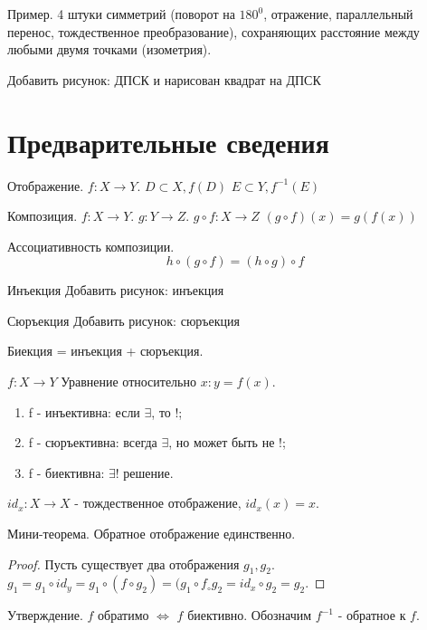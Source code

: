 \documentclass[12pt,a4paper]{report}
\begin{document}
Пример. 4 штуки симметрий (поворот на $180^0$, отражение, параллельный перенос, тождественное преобразование), сохраняющих расстояние между любыми двумя точками (изометрия).

Добавить рисунок: ДПСК и нарисован квадрат на ДПСК

\section{Предварительные сведения}

Отображение. $f\colon X\to Y$.
$D\subset X, f(D)$
$E\subset Y, f^{-1}(E)$

Композиция. $f\colon X\to Y$.
$g\colon Y\to Z$.
$g \circ f\colon X\to Z$
$(g\circ f)(x)=g(f(x))$

Ассоциативность композиции.
\[h\circ(g\circ f)=(h\circ g)\circ f\]

Инъекция
Добавить рисунок: инъекция

Сюръекция
Добавить рисунок: сюръекция

Биекция = инъекция + сюръекция.

$f\colon X\to Y$
Уравнение относительно $x\colon y = f(x)$.
\begin{enumerate}
    \item f - инъективна: если $\exists$, то !;
    \item f - сюръективна: всегда $\exists$, но может быть не !;
    \item f - биективна: $\exists!$ решение.
\end{enumerate}

$id_x\colon X\to X$ - тождественное отображение, $id_x(x)=x$.


Мини-теорема. Обратное отображение единственно.
\begin{proof}
    Пусть существует два отображения $g_1,g_2$. \\
    $g_1=g_1\circ id_y=g_1\circ(f\circ g_2)=(g_1\circ f_\circ g_2=id_x\circ g_2=g_2$.
\end{proof}

Утверждение. $f$ обратимо $\iff$ $f$ биективно.
Обозначим $f^{-1}$ - обратное к $f$.

\end{document}
